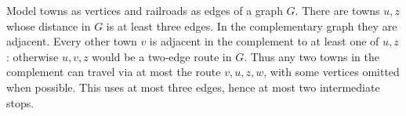 Model towns as vertices and railroads as edges of a graph $G$. There are towns $u,z$ whose distance in $G$ is at least three edges. In the complementary graph they are adjacent. Every other town $v$ is adjacent in the complement to at least one of $u,z$: otherwise $u,v,z$ would be a two-edge route in $G$. Thus any two towns in the complement can travel via at most the route $v,u,z,w$, with some vertices omitted when possible. This uses at most three edges, hence at most two intermediate stops.
